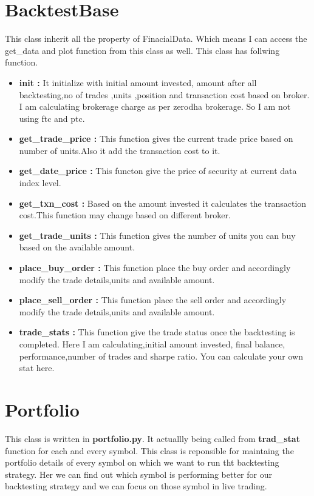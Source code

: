 \documentclass{report}
\begin{document}
\section{BacktestBase}
This class inherit all the property of FinacialData. Which means I can access the get\_data and plot function from this class as well. This class has follwing function.

\begin{itemize}
  \item \textbf{init :}
  It initialize with initial amount invested, amount after all backtesting,no of trades ,units ,position and transaction cost based on broker. I am calculating brokerage charge as per zerodha brokerage. So I am not using ftc and ptc.
  \item \textbf{get\_trade\_price :}
  This function gives the current trade price based on number of units.Also it add the transaction cost to it.
  \item \textbf{get\_date\_price :}
  This functon give the price of security at current data index level.
  \item \textbf{get\_txn\_cost :}
  Based on the amount invested it calculates the transaction cost.This function may change based on different broker.
  \item \textbf{get\_trade\_units :}
  This function gives the number of units you can buy based on the available amount.
  \item \textbf{place\_buy\_order :}
  This function place the buy order and accordingly modify the trade details,units and available amount.
  \item \textbf{place\_sell\_order :}
  This function place the sell order and accordingly modify the trade details,units and available amount.
  \item \textbf{trade\_stats :}
  This function give the trade status once the backtesting is completed. Here I am calculating,initial amount invested, final balance, performance,number of trades and sharpe ratio.
  You can calculate your own stat here.

\end{itemize}

\section{Portfolio}
This class is written in \textbf{portfolio.py}. It actuallly being called from \textbf{trad\_stat} function for each and every symbol. This class is reponsible for maintaing the portfolio details of every symbol on which we want to run tht backtesting strategy. Her we can find out which symbol is performing better for our backtesting strategy and we can focus on those symbol in live trading.
\end{document}
